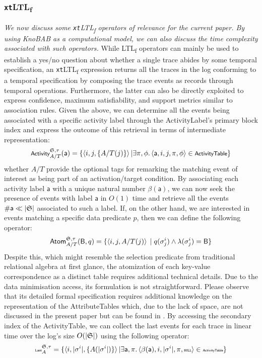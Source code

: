\documentclass[sigconf]{acmart}
\newcommand{\const}[1]{\ensuremath{\mathsf{#1}}}
\begin{document}
\subsubsection{\texttt{xt}LTL\textsubscript{f}}
\textit{We now discuss some \texttt{xt}LTL\textsubscript{f} operators of relevance for the current paper. By using KnoBAB as a computational model, we can also discuss the time complexity associated with such operators.} While LTL\textsubscript{f} operators can mainly be used to establish a yes/no question about whether a single trace abides by some temporal specification, an \texttt{xt}LTL\textsubscript{f} expression returns all the traces in the log conforming to a temporal specification by composing the trace events as records through temporal operations. Furthermore, the latter can also be directly exploited to express confidence, maximum satisfiability, and support metrics similar to association rules. Given the above, we can determine all the events being associated with a specific activity label through the ActivityLabel's primary block index and express the outcome of this retrieval in terms of intermediate representation:
\[\footnotesize \textsf{Activity}^{\LOG,\tau}_{A/T}(\const{a})=\{\braket{i,j,\{A/T(j)\}}|\exists \pi,\phi.\braket{\const{a},i,j,\pi,\phi}\in\textsf{ActivityTable}\}\]
whether $A/T$ provide the optional tags for remarking the matching event of interest as being part of an activation/target condition. By associating each activity label \const{a} with a unique natural number $\beta(\const{a})$, we can now seek the presence of events with label \const{a} in $O(1)$ time and retrieve all the events $\#{\textsf{a}}\ll |\mathfrak{S}|$ associated to such a label. If, on the other hand, we are interested in events matching a specific data predicate $p$, then we can define the following operator:
\[\textsf{Atom}^{\mathfrak{S},\tau}_{A/T}(\textsf{B},q)=\{\braket{i,j,{A/T(j)}}\;|\;q(\sigma^i_j)\wedge \lambda(\sigma^i_j)=\textsf{B}\}\]
Despite this, which might resemble the selection predicate from traditional relational algebra at first glance, the atomization of each key-value correspondence as a distinct table requires additional technical details. Due to the data minimisation access, its formulation is not straightforward. Please observe that its detailed formal specification requires additional knowledge on the representation of the AttributeTables which, due to the lack of space, are not discussed in the present paper but can be found in  \cite{info14030173}. By accessing the secondary index of the \textsf{ActivityTable}, we can collect the last events for each trace in linear time over the log's size $O(|\mathfrak{S}|)$ using the following operator:
\[\tiny\textsf{Last}^{\LOG,\tau}_{A}=\{\braket{i,\vert\sigma^i\vert,\{A(\vert\sigma^i\vert)\}}|\exists \const{a}, \pi.\braket{\beta(\const{a}),i,|\sigma^i|,\pi,\texttt{NULL}}\in\textsf{ActivityTable}\}\]
\end{document}
